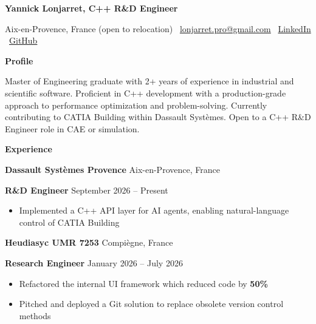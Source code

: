 \documentclass[11pt]{article}
\begin{document}
\begin{center}
    \textbf{Yannick Lonjarret,  C++ R\&D Engineer}\\ 
    \hrulefill
\end{center}

\begin{center}
    Aix-en-Provence, France (open to relocation) \textbullet \ \href{mailto:lonjarret.pro@gmail.com}{lonjarret.pro@gmail.com} \textbullet \
   \href{https://www.linkedin.com/in/ylonjarr/}{LinkedIn} \textbullet \ \href{https://github.com/yannickLonjarret}{GitHub}
\end{center}
\begin{center}
    \textbf{Profile}
\end{center}

Master of Engineering graduate with 2+ years of experience in industrial and scientific software. Proficient in C++ development with a production-grade approach to performance optimization and problem-solving. Currently contributing to CATIA Building within Dassault Systèmes. Open to a C++ R\&D Engineer role in CAE or simulation.
\vspace{0.5pt}

\begin{center}
    \textbf{Experience}
\end{center}

\textbf{Dassault Systèmes Provence} \hfill Aix-en-Provence, France

\textbf{R\&D Engineer} \hfill September 2026 – Present
\begin{itemize}[noitemsep, topsep=0pt, partopsep=0pt, parsep=0pt]
    \item Implemented a C++ API layer for AI agents, enabling natural-language control of CATIA Building

\end{itemize}

\vspace{6pt}

\textbf{Heudiasyc UMR 7253} \hfill Compiègne, France

\textbf{Research Engineer} \hfill January 2026 – July 2026
\begin{itemize}[noitemsep, topsep=0pt, partopsep=0pt, parsep=0pt]
    \item Refactored the internal UI framework which reduced code by \textbf{50\%}
    \item  Pitched and deployed a Git solution to replace obsolete version control methods
\end{itemize}
\end{document}
